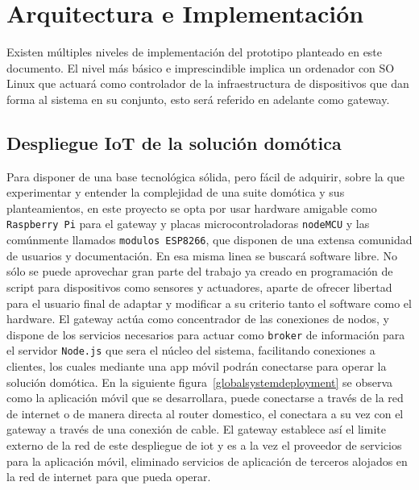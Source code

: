 \cleardoublepage

\chapter{Arquitectura e Implementación}
\label{ch:Capitulo4}

Existen múltiples niveles de implementación del prototipo planteado en este documento. El nivel más básico e imprescindible implica un ordenador con SO Linux que actuará como controlador de la infraestructura de dispositivos que dan forma al sistema en su conjunto, esto será referido en adelante como \gls{gateway}.

\vspace{1cm}

\section{Despliegue IoT de la solución domótica}
\label{ch:Capitulo4.1}

Para disponer de una base tecnológica sólida, pero fácil de adquirir, sobre la que experimentar y entender la complejidad de una suite domótica y sus planteamientos, en este proyecto se opta por usar hardware amigable como \verb|Raspberry Pi| para el \gls{gateway} y placas microcontroladoras \verb|nodeMCU| y las comúnmente llamados \verb|modulos ESP8266|, que disponen de una extensa comunidad de usuarios y documentación. En esa misma linea se buscará software libre. No sólo se puede aprovechar gran parte del trabajo ya creado en programación de \gls{script} para dispositivos como sensores y actuadores, aparte de ofrecer libertad para el usuario final de adaptar y modificar a su criterio tanto el software como el hardware. El \gls{gateway} actúa como concentrador de las conexiones de nodos, y dispone de los servicios necesarios para actuar como \verb|broker| de información para el servidor \verb|Node.js| que sera el núcleo del sistema, facilitando conexiones a clientes, los cuales mediante una \gls{app} móvil podrán conectarse para operar la solución domótica. En la siguiente figura~\ref{globalsystemdeployment} se observa como la aplicación móvil que se desarrollara, puede conectarse a través de la red de internet o de manera directa al router domestico, el conectara a su vez con el \gls{gateway} a través de una conexión de cable. El \gls{gateway} establece así el limite externo de la red de este despliegue de \gls{iot} y es a la vez el proveedor de servicios para la aplicación móvil, eliminado servicios de aplicación de terceros alojados en la red de internet para que pueda operar.

